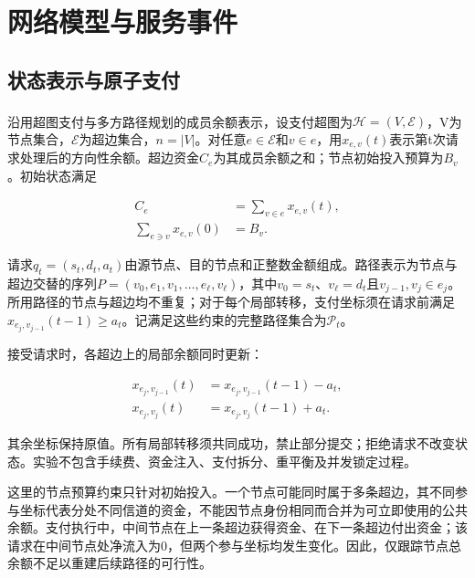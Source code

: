 \documentclass[UTF8,a4paper,twocolumn,fontset=none,zihao=5]{ctexart}
\newcommand{\upcite}[1]{\textsuperscript{\cite{#1}}}
\begin{document}
\section{网络模型与服务事件}

\subsection{状态表示与原子支付}

沿用超图支付与多方路径规划的成员余额表示\upcite{r10,r11}，设支付超图为$\mathcal H=(V,\mathcal E)$，V为节点集合，$\mathcal E$为超边集合，$n=|V|$。对任意$e\in\mathcal E$和$v\in e$，用$x_{e,v}(t)$表示第t次请求处理后的方向性余额。超边资金$C_e$为其成员余额之和；节点初始投入预算为$B_v$。初始状态满足



\begin{equation}
\begin{aligned} C_e&=\sum_{v\in e}x_{e,v}(t),\\ \sum_{e\ni v}x_{e,v}(0)&=B_v.\end{aligned}
\label{eq:1}\end{equation}


请求$q_t=(s_t,d_t,a_t)$由源节点、目的节点和正整数金额组成。路径表示为节点与超边交替的序列$P=(v_0,e_1,v_1,\ldots,e_\ell,v_\ell)$，其中$v_0=s_t$、$v_\ell=d_t$且$v_{j-1},v_j\in e_j$。所用路径的节点与超边均不重复；对于每个局部转移，支付坐标须在请求前满足$x_{e_j,v_{j-1}}(t-1)\geq a_t$。记满足这些约束的完整路径集合为$\mathcal P_t$。


接受请求时，各超边上的局部余额同时更新：



\begin{equation}
\begin{aligned}x_{e_j,v_{j-1}}(t)&=x_{e_j,v_{j-1}}(t-1)-a_t,\\x_{e_j,v_j}(t)&=x_{e_j,v_j}(t-1)+a_t.\end{aligned}
\label{eq:2}\end{equation}


其余坐标保持原值。所有局部转移须共同成功，禁止部分提交；拒绝请求不改变状态。实验不包含手续费、资金注入、支付拆分、重平衡及并发锁定过程。


这里的节点预算约束只针对初始投入。一个节点可能同时属于多条超边，其不同参与坐标代表分处不同信道的资金，不能因节点身份相同而合并为可立即使用的公共余额。支付执行中，中间节点在上一条超边获得资金、在下一条超边付出资金；该请求在中间节点处净流入为0，但两个参与坐标均发生变化。因此，仅跟踪节点总余额不足以重建后续路径的可行性。
\end{document}
